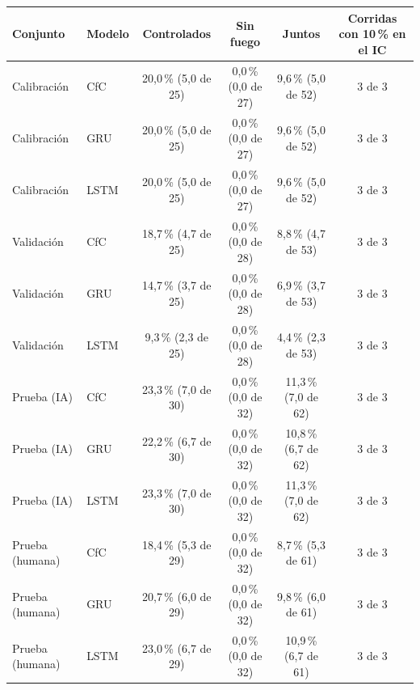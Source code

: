 \begin{tabular}{|l|l|c|c|c|c|}
\hline
\textbf{Conjunto} & \textbf{Modelo} & \textbf{Controlados} & \textbf{Sin fuego} & \textbf{Juntos} & \textbf{Corridas con 10\,\% en el IC} \\ \hline
Calibración & CfC & 20{,}0\,\% (5{,}0 de 25) & 0{,}0\,\% (0{,}0 de 27) & 9{,}6\,\% (5{,}0 de 52) & 3 de 3 \\ \hline
Calibración & GRU & 20{,}0\,\% (5{,}0 de 25) & 0{,}0\,\% (0{,}0 de 27) & 9{,}6\,\% (5{,}0 de 52) & 3 de 3 \\ \hline
Calibración & LSTM & 20{,}0\,\% (5{,}0 de 25) & 0{,}0\,\% (0{,}0 de 27) & 9{,}6\,\% (5{,}0 de 52) & 3 de 3 \\ \hline
Validación & CfC & 18{,}7\,\% (4{,}7 de 25) & 0{,}0\,\% (0{,}0 de 28) & 8{,}8\,\% (4{,}7 de 53) & 3 de 3 \\ \hline
Validación & GRU & 14{,}7\,\% (3{,}7 de 25) & 0{,}0\,\% (0{,}0 de 28) & 6{,}9\,\% (3{,}7 de 53) & 3 de 3 \\ \hline
Validación & LSTM & 9{,}3\,\% (2{,}3 de 25) & 0{,}0\,\% (0{,}0 de 28) & 4{,}4\,\% (2{,}3 de 53) & 3 de 3 \\ \hline
Prueba (IA) & CfC & 23{,}3\,\% (7{,}0 de 30) & 0{,}0\,\% (0{,}0 de 32) & 11{,}3\,\% (7{,}0 de 62) & 3 de 3 \\ \hline
Prueba (IA) & GRU & 22{,}2\,\% (6{,}7 de 30) & 0{,}0\,\% (0{,}0 de 32) & 10{,}8\,\% (6{,}7 de 62) & 3 de 3 \\ \hline
Prueba (IA) & LSTM & 23{,}3\,\% (7{,}0 de 30) & 0{,}0\,\% (0{,}0 de 32) & 11{,}3\,\% (7{,}0 de 62) & 3 de 3 \\ \hline
Prueba (humana) & CfC & 18{,}4\,\% (5{,}3 de 29) & 0{,}0\,\% (0{,}0 de 32) & 8{,}7\,\% (5{,}3 de 61) & 3 de 3 \\ \hline
Prueba (humana) & GRU & 20{,}7\,\% (6{,}0 de 29) & 0{,}0\,\% (0{,}0 de 32) & 9{,}8\,\% (6{,}0 de 61) & 3 de 3 \\ \hline
Prueba (humana) & LSTM & 23{,}0\,\% (6{,}7 de 29) & 0{,}0\,\% (0{,}0 de 32) & 10{,}9\,\% (6{,}7 de 61) & 3 de 3 \\ \hline
\end{tabular}
